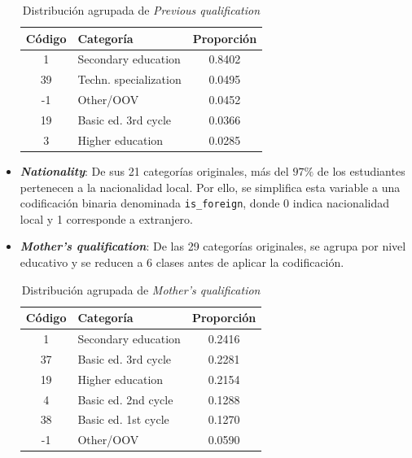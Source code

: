 \documentclass{report}[14pt]
\begin{document}
\begin{itemize}
    \begin{table}[H]
    \centering
    \begin{tabular}{|c|l|c|}
        \hline
        \textbf{Código} & \textbf{Categoría} & \textbf{Proporción} \\
        \hline
        1 & Secondary education & 0.8402 \\
        39 & Techn. specialization & 0.0495 \\
        -1 & Other/OOV & 0.0452 \\
        19 & Basic ed. 3rd cycle & 0.0366 \\
        3 & Higher education & 0.0285 \\
        \hline
    \end{tabular}
    \caption{Distribución agrupada de \textit{Previous qualification}}
    \label{tab:previous_qualification}
    \end{table}

    \item \textbf{\textit{Nationality}}: De sus 21 categorías originales, más del $97\%$ de los estudiantes pertenecen a la nacionalidad local. Por ello, se simplifica esta variable a una codificación binaria denominada \texttt{is\_foreign}, donde 0 indica nacionalidad local y 1 corresponde a extranjero.
    
    \item \textbf{\textit{Mother's qualification}}: De las 29 categorías originales, se agrupa por nivel educativo y se reducen a 6 clases antes de aplicar la codificación.
    \begin{table}[H]
    \centering
    \begin{tabular}{|c|l|c|}
        \hline
        \textbf{Código} & \textbf{Categoría} & \textbf{Proporción} \\
        \hline
        1 & Secondary education & 0.2416 \\
        37 & Basic ed. 3rd cycle & 0.2281 \\
        19 & Higher education & 0.2154 \\
        4 & Basic ed. 2nd cycle & 0.1288 \\
        38 & Basic ed. 1st cycle & 0.1270 \\
        -1 & Other/OOV & 0.0590 \\
        \hline
    \end{tabular}
    \caption{Distribución agrupada de \textit{Mother's qualification}}
    \label{tab:mothers_qualification}
    \end{table}


\end{itemize}
\end{document}
